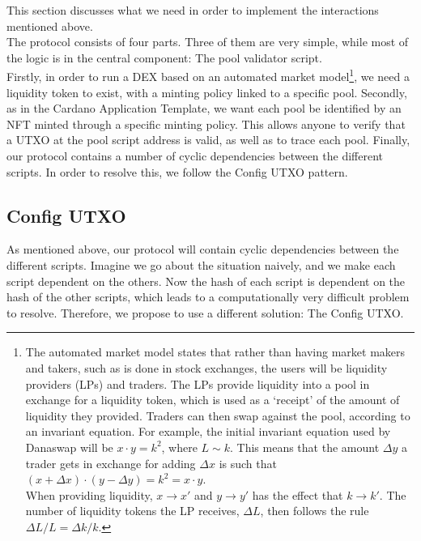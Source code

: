 \documentclass{article}
\begin{document}
This section discusses what we need in order to implement the interactions
mentioned above. \\

The protocol consists of four parts. Three of them are very simple, while most
of the logic is in the central component: The pool validator script. \\

Firstly, in order to run a DEX based on an automated market model\footnote{
  The automated market model states that rather than having market makers and
  takers, such as is done in stock exchanges, the users will be liquidity
  providers (LPs) and traders. The LPs provide liquidity into a pool in exchange
  for a liquidity token, which is used as a `receipt' of the amount of liquidity
  they provided. Traders can then swap against the pool, according to an
  invariant equation. For example, the initial invariant equation used by
  Danaswap will be $x \cdot y = k^2$, where $L \sim k$. This means that the
  amount $\Delta y$ a trader gets in exchange for adding $\Delta x$ is such that
  $(x + \Delta x) \cdot (y - \Delta y) = k^2 = x \cdot y$. \\

  When providing liquidity, $x \rightarrow x'$ and $y \rightarrow y'$ has the
  effect that $k \rightarrow k'$. The number of liquidity tokens the LP
  receives, $\Delta L$, then follows the rule $\Delta L / L = \Delta k / k$.
}, we need a liquidity token to exist, with a minting policy linked to a
specific pool.
Secondly, as in the Cardano Application Template, we want each pool be
identified by an NFT minted through a specific minting policy. This allows
anyone to verify that a UTXO at the pool script address is valid, as well as to
trace each pool.
Finally, our protocol contains a number of cyclic dependencies between the
different scripts. In order to resolve this, we follow the Config UTXO pattern.

\subsection{Config UTXO}

As mentioned above, our protocol will contain cyclic dependencies between the
different scripts. Imagine we go about the situation naively, and we make each
script dependent on the others. Now the hash of each script is dependent on the
hash of the other scripts, which leads to a computationally very difficult
problem to resolve. Therefore, we propose to use a different solution: The
Config UTXO. \\
\end{document}
